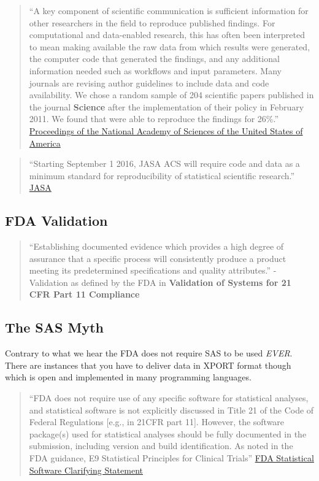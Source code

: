 \documentclass[]{book}
\theoremstyle{definition}
\theoremstyle{definition}
\theoremstyle{definition}
\theoremstyle{remark}
\begin{document}
\begin{quote}
``A key component of scientific communication is sufficient information
for other researchers in the field to reproduce published findings. For
computational and data-enabled research, this has often been interpreted
to mean making available the raw data from which results were generated,
the computer code that generated the findings, and any additional
information needed such as workflows and input parameters. Many journals
are revising author guidelines to include data and code availability. We
chose a random sample of 204 scientific papers published in the journal
\textbf{Science} after the implementation of their policy in February
2011. We found that were able to reproduce the findings for 26\%.''
\href{http://www.pnas.org/content/115/11/2584}{Proceedings of the
National Academy of Sciences of the United States of America}
\end{quote}

\begin{quote}
``Starting September 1 2016, JASA ACS will require code and data as a
minimum standard for reproducibility of statistical scientific
research.''
\href{https://magazine.amstat.org/blog/2016/07/01/jasa-reproducible16/}{JASA}
\end{quote}

\subsection{FDA Validation}\label{fda-validation}

\begin{quote}
``Establishing documented evidence which provides a high degree of
assurance that a specific process will consistently produce a product
meeting its predetermined specifications and quality attributes.''
-Validation as defined by the FDA in \textbf{Validation of Systems for
21 CFR Part 11 Compliance}
\end{quote}

\subsection{The SAS Myth}\label{the-sas-myth}

Contrary to what we hear the FDA does not require SAS to be used
\emph{EVER}. There are instances that you have to deliver data in XPORT
format though which is open and implemented in many programming
languages.

\begin{quote}
``FDA does not require use of any specific software for statistical
analyses, and statistical software is not explicitly discussed in Title
21 of the Code of Federal Regulations {[}e.g., in 21CFR part 11{]}.
However, the software package(s) used for statistical analyses should be
fully documented in the submission, including version and build
identification. As noted in the FDA guidance, E9 Statistical Principles
for Clinical Trials''
\href{https://www.fda.gov/downloads/forindustry/datastandards/studydatastandards/ucm587506.pdf}{FDA
Statistical Software Clarifying Statement}
\end{quote}
\end{document}
